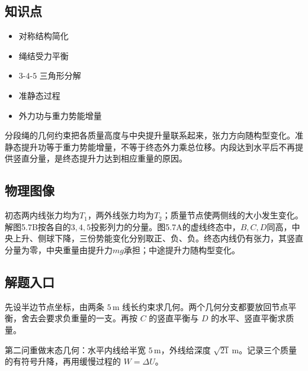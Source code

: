 \documentclass[UTF8,fontset=fandol,a4paper,11pt]{ctexart}
\providecommand{\tightlist}{\setlength{\itemsep}{0pt}\setlength{\parskip}{0pt}}
\begin{document}


\subsection*{知识点}

\begin{itemize}
\tightlist
\item
  对称结构简化
\item
  绳结受力平衡
\item
  \(3\)-\(4\)-\(5\) 三角形分解
\item
  准静态过程
\item
  外力功与重力势能增量
\end{itemize}

分段绳的几何约束把各质量高度与中央提升量联系起来，张力方向随构型变化。准静态提升功等于重力势能增量，不等于终态外力乘总位移。内段达到水平后不再提供竖直分量，是终态提升力达到相应重量的原因。




\subsection*{物理图像}

初态两内线张力均为$T_1$，两外线张力均为$T_2$；质量节点使两侧线的大小发生变化。解图5.7B按各自的$3,4,5$投影列力的分量。图5.7A的虚线终态中，$B,C,D$同高，中央上升、侧球下降，三份势能变化分别取正、负、负。终态内线仍有张力，其竖直分量为零，中央重量由提升力$mg$承担；中途提升力随构型变化。



\subsection*{解题入口}

先设半边节点坐标，由两条 $5\,\mathrm m$ 线长约束求几何。两个几何分支都要放回节点平衡，舍去会要求负重量的一支。再按 $C$ 的竖直平衡与 $D$ 的水平、竖直平衡求质量。

第二问重做末态几何：水平内线给半宽 $5\,\mathrm m$，外线给深度 $\sqrt{21}\,\mathrm m$。记录三个质量的有符号升降，再用缓慢过程的 $W=\Delta U$。


\end{document}
